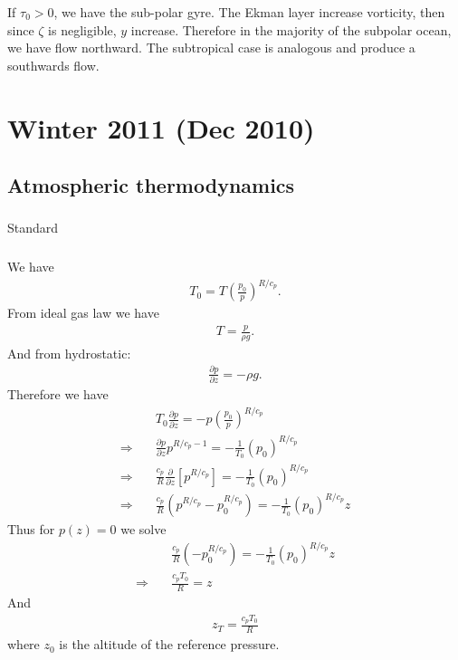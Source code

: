 \documentclass[11pt,letterpaper]{book}
\theoremstyle{definition}
\newcommand{\pe}{\partial}
\newcommand{\thus}{\Rightarrow \quad }
\begin{document}
If $\tau_0>0$, we have the sub-polar gyre. The Ekman layer increase vorticity, then since $\zeta$ is negligible, $y$ increase. Therefore in the majority of the subpolar ocean, we have flow northward. The subtropical case is analogous and produce a southwards flow.

\chapter{Winter 2011 (Dec 2010)}
\section{Atmospheric thermodynamics}
\subsection{}
Standard

\subsection{}
We have
\begin{align*}
T_0 = T\left(\frac{p_0}{p}\right)^{R/c_p}.
\end{align*}
From ideal gas law we have
\begin{align*}
T = \frac{p}{\rho g}.
\end{align*}
And from hydrostatic:
\begin{align*}
\frac{\pe p}{\pe z} = -\rho g.
\end{align*}
Therefore we have
\begin{align*}
&T_0\frac{\pe p}{\pe z} = -p\left(\frac{p_0}{p}\right)^{R/c_p}\\
\thus &\frac{\pe p}{\pe z}p^{R/c_p-1} = -\frac{1}{T_0}\left({p_0}\right)^{R/c_p}\\
\thus &\frac{c_p}{R}\frac{\pe}{\pe z}\left[p^{R/c_p} \right] = -\frac{1}{T_0}\left({p_0}\right)^{R/c_p}\\
\thus &\frac{c_p}{R} \left(p^{R/c_p}-p_0^{R/c_p}\right) = -\frac{1}{T_0}\left({p_0}\right)^{R/c_p}z
\end{align*}
Thus for $p(z) = 0$ we solve
\begin{align*}
&\frac{c_p}{R} \left(-p_0^{R/c_p}\right) = -\frac{1}{T_0}\left({p_0}\right)^{R/c_p}z\\
\thus &\frac{c_p T_0}{R} = z
\end{align*}
And 
\begin{align*}
z_T = \frac{c_p T_0}{R}
\end{align*}
where $z_0$ is the altitude of the reference pressure.
\end{document}
